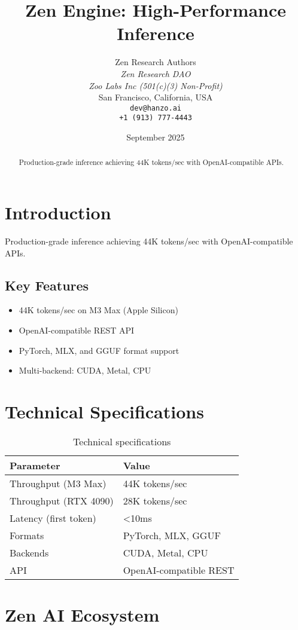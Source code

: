 \documentclass[11pt,a4paper]{article}
\title{Zen Engine: High-Performance Inference}
\author{
    Zen Research Authors \\
    \textit{Zen Research DAO} \\
    \textit{Zoo Labs Inc (501(c)(3) Non-Profit)} \\
    San Francisco, California, USA \\
    \texttt{dev@hanzo.ai} \\
    \texttt{+1 (913) 777-4443}
}
\date{September 2025}
\begin{document}
\maketitle

\begin{abstract}
Production-grade inference achieving 44K tokens/sec with OpenAI-compatible APIs.
\end{abstract}

\section{Introduction}
Production-grade inference achieving 44K tokens/sec with OpenAI-compatible APIs.

\subsection{Key Features}
\begin{itemize}
    \item 44K tokens/sec on M3 Max (Apple Silicon)
    \item OpenAI-compatible REST API
    \item PyTorch, MLX, and GGUF format support
    \item Multi-backend: CUDA, Metal, CPU
\end{itemize}

\section{Technical Specifications}
\begin{table}[h]
\centering
\begin{tabular}{@{}ll@{}}
\toprule
\textbf{Parameter} & \textbf{Value} \\
\midrule
Throughput (M3 Max) & 44K tokens/sec \\
Throughput (RTX 4090) & 28K tokens/sec \\
Latency (first token) & <10ms \\
Formats & PyTorch, MLX, GGUF \\
Backends & CUDA, Metal, CPU \\
API & OpenAI-compatible REST
\bottomrule
\end{tabular}
\caption{Technical specifications}
\label{tab:specs}
\end{table}

\section{Zen AI Ecosystem}
\end{document}
